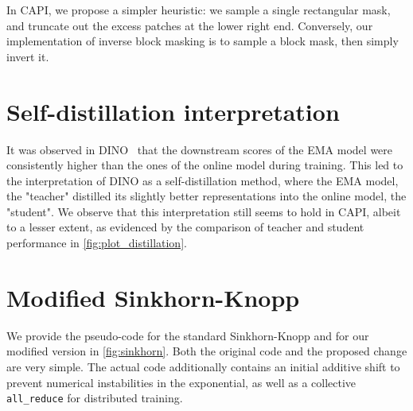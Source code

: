 In CAPI, we propose a simpler heuristic: we sample a single rectangular mask, and truncate out the excess patches at the lower right end.
Conversely, our implementation of inverse block masking is to sample a block mask, then simply invert it.

\section{Self-distillation interpretation}
It was observed in DINO~\citep{dino} that the downstream scores of the EMA model were consistently higher than the ones of the online model during training.
This led to the interpretation of DINO as a self-distillation method, where the EMA model, the "teacher" distilled its slightly better representations into the online model, the "student".
We observe that this interpretation still seems to hold in CAPI, albeit to a lesser extent, as evidenced by the comparison of teacher and student performance in \autoref{fig:plot_distillation}.



\section{Modified Sinkhorn-Knopp}
We provide the pseudo-code for the standard Sinkhorn-Knopp and for our modified version in \autoref{fig:sinkhorn}.
Both the original code and the proposed change are very simple.
The actual code additionally contains an initial additive shift to prevent numerical instabilities in the exponential, as well as a collective \texttt{all\_reduce} for distributed training.


